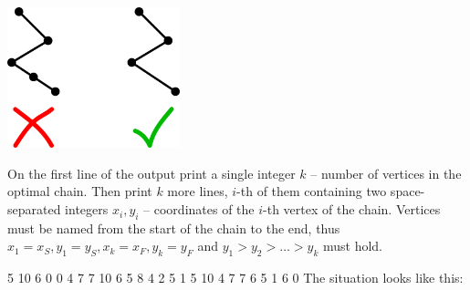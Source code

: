 \begin{center}
\includegraphics[width=5cm]{img/skiing1}
\end{center}

On the first line of the output print a single integer $k$ -- number of vertices in the optimal chain. Then print $k$ more lines, $i$-th of them containing two space-separated integers $x_i, y_i$ -- coordinates of the $i$-th vertex of the chain. Vertices must be named from the start of the chain to the
end, thus
$x_1 = x_S, y_1 = y_S, x_k = x_F, y_k = y_F$ and $y_1 > y_2 > \dots > y_k$ must hold.



5 10 6 0
0 4 7
7 10 6
5 8 4
2 5 1
5 10
4 7
7 6
5 1
6 0
\sampleCOMMENT
The situation looks like this:
\sampleEND
{}


